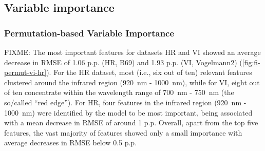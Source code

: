 \documentclass[remotesensing,article,submit,moreauthors,pdftex]{Definitions/mdpi}
\begin{document}
\subsection{Variable importance}

\subsubsection{Permutation-based Variable Importance}


FIXME:
The most important features for datasets HR and VI showed an average decrease in RMSE of 1.06 p.p. (HR, B69) and 1.93 p.p. (VI, Vogelmann2) (\autoref{fig:fi-permut-vi-hr}).
For the HR dataset, most (i.e., six out of ten) relevant features clustered around the infrared region (920~nm - 1000~nm), while for VI, eight out of ten concentrate within the wavelength range of 700~nm - 750~nm (the so\-/called \enquote{red edge}).
For HR, four features in the infrared region (920~nm - 1000~nm) were identified by the model to be most important, being associated with a mean decrease in RMSE of around 1 p.p.
Overall, apart from the top five features, the vast majority of features showed only a small importance with average decreases in RMSE below 0.5 p.p.
\end{document}
